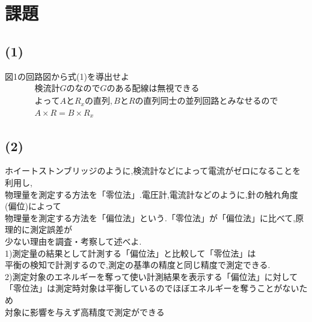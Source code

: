\documentclass[titlepage]{jarticle}
\begin{document}
\section{課題}
\subsection{(1)}
図1の回路図から式(1)を導出せよ
\begin{eqnarray}
    検流計GのなのでGのある配線は無視できる　\nonumber\\
    よってAとR_xの直列,BとRの直列同士の並列回路とみなせるので　\nonumber\\
    A×R=B×R_x　\nonumber
\end{eqnarray}
\subsection{(2)}
ホイートストンブリッジのように,検流計などによって電流がゼロになることを利用し,\\
物理量を測定する方法を「零位法」.電圧計,電流計などのように,針の触れ角度(偏位)によって\\
物理量を測定する方法を「偏位法」という.「零位法」が「偏位法」に比べて,原理的に測定誤差が\\
少ない理由を調査・考察して述べよ.\\

1)測定量の結果として計測する「偏位法」と比較して「零位法」は\\
平衡の検知で計測するので,測定の基準の精度と同じ精度で測定できる.\\
2)測定対象のエネルギーを奪って使い計測結果を表示する「偏位法」に対して\\
「零位法」は測定時対象は平衡しているのでほぼエネルギーを奪うことがないため\\
対象に影響を与えず高精度で測定ができる
\end{document}

